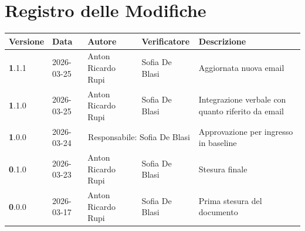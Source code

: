 \section*{Registro delle Modifiche}
\begin{table}[ht]
	\centering
	\renewcommand{\arraystretch}{1.5}
	\begin{longtable}{>{\textbf}l l l l>{\raggedright\arraybackslash}p{5cm}}
		\toprule
		\textbf{Versione} & \textbf{Data} & \textbf{Autore} & \textbf{Verificatore} & \textbf{Descrizione} \\
		\midrule
		1.1.1 & 2026-03-25 & Anton Ricardo Rupi & Sofia De Blasi & Aggiornata nuova email \\
		1.1.0 & 2026-03-25 & Anton Ricardo Rupi & Sofia De Blasi & Integrazione verbale con quanto riferito da email \\
		1.0.0 & 2026-03-24 & \multicolumn{2}{c}{Responsabile: Sofia De Blasi} & Approvazione per ingresso in baseline \\
		0.1.0 & 2026-03-23 & Anton Ricardo Rupi & Sofia De Blasi & Stesura finale \\
		0.0.0 & 2026-03-17 & Anton Ricardo Rupi & Sofia De Blasi & Prima stesura del documento \\
		\bottomrule
	\end{longtable}
\end{table}